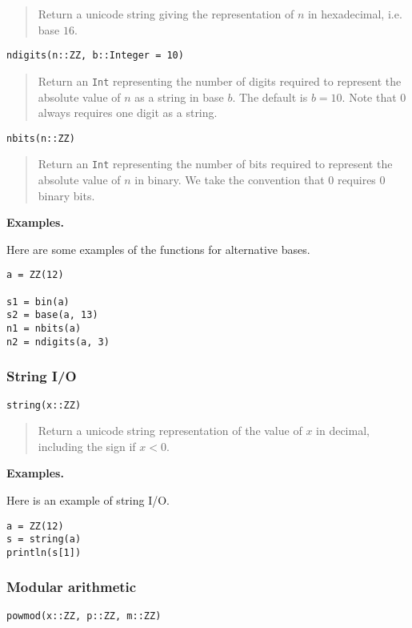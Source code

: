 \documentclass[a4paper,10pt]{article}
\newcommand{\code}{\lstinline}
\newcommand{\desc}[1]{\vspace{-3mm}\begin{quote}#1\end{quote}}
\begin{document}
{{{\desc{Return a unicode string giving the representation of $n$ in hexadecimal, i.e. base $16$.}

\begin{lstlisting}
ndigits(n::ZZ, b::Integer = 10)
\end{lstlisting}

\desc{Return an \code{Int} representing the number of digits required to represent the
absolute value of $n$ as a string in base $b$. The default is $b = 10$. Note that $0$
always requires one digit as a string.}

\begin{lstlisting}
nbits(n::ZZ)
\end{lstlisting}

\desc{Return an \code{Int} representing the number of bits required to represent the
absolute value of $n$ in binary. We take the convention that $0$ requires $0$ binary 
bits.}

\textbf{Examples.}

Here are some examples of the functions for alternative bases.

\begin{lstlisting}
a = ZZ(12)

s1 = bin(a)
s2 = base(a, 13)
n1 = nbits(a)
n2 = ndigits(a, 3)
\end{lstlisting}

\subsubsection{String I/O}

\begin{lstlisting}
string(x::ZZ)
\end{lstlisting}

\desc{Return a unicode string representation of the value of $x$ in decimal, including the sign
if $x < 0$.}

\textbf{Examples.}

Here is an example of string I/O.

\begin{lstlisting}
a = ZZ(12)
s = string(a)
println(s[1])
\end{lstlisting}

\subsubsection{Modular arithmetic}

\begin{lstlisting}
powmod(x::ZZ, p::ZZ, m::ZZ)
\end{lstlisting}

}}}
\end{document}
